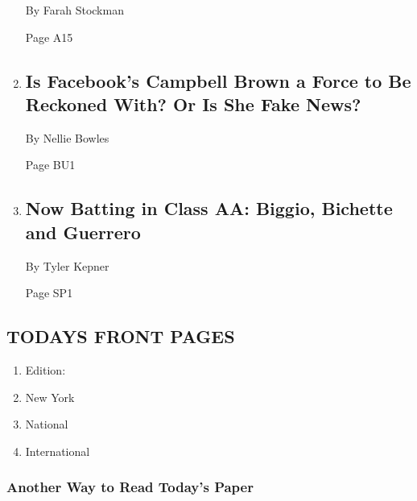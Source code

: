 \begin{enumerate}
  By Farah Stockman

  Page A15
\item
  \href{/2018/04/21/technology/facebook-campbell-brown-news.html}{}

  \hypertarget{is-facebooks-campbell-brown-a-force-to-be-reckoned-with-or-is-she-fake-news}{%
  \subsection{Is Facebook's Campbell Brown a Force to Be Reckoned With?
  Or Is She Fake
  News?}\label{is-facebooks-campbell-brown-a-force-to-be-reckoned-with-or-is-she-fake-news}}

  By Nellie Bowles

  Page BU1
\item
  \href{/2018/04/20/sports/baseball/minor-leagues.html}{}

  \hypertarget{now-batting-in-class-aa-biggio-bichette-and-guerrero}{%
  \subsection{Now Batting in Class AA: Biggio, Bichette and
  Guerrero}\label{now-batting-in-class-aa-biggio-bichette-and-guerrero}}

  By Tyler Kepner

  Page SP1
\end{enumerate}

\hypertarget{todays-front-pages}{%
\subsection{TODAYS FRONT PAGES}\label{todays-front-pages}}

\begin{enumerate}
\def\labelenumi{\arabic{enumi}.}
\tightlist
\item
  Edition:
\item
  New York
\item
  National
\item
  International
\end{enumerate}

\href{http://app.nytimes3xbfgragh.onion/todayspaper}{}

\hypertarget{another-way-to-read-todays-paper}{%
\subsubsection{Another Way to Read Today's
Paper}\label{another-way-to-read-todays-paper}}

